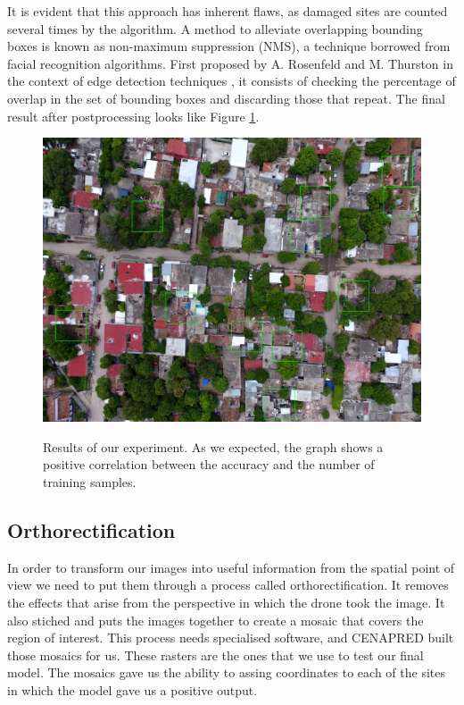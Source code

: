 It is evident that this approach has inherent flaws, as damaged sites are counted several times by the algorithm. A method to alleviate overlapping bounding boxes is known as non-maximum suppression (NMS), a technique borrowed from facial recognition algorithms. First proposed by A. Rosenfeld and M. Thurston in the context of edge detection techniques \cite{1671883}, it consists of checking the percentage of overlap in the set of bounding boxes and discarding those that repeat. The final result after postprocessing looks like Figure \ref{fig:no-overlap}.\\


\begin{figure}[!h]
  \centering
  \includegraphics[width=\textwidth]{images/no-overlap.jpg}
  \label{fig:no-overlap}
  \caption{Results of our experiment. As we expected, the graph shows a positive correlation between the accuracy and the number of training samples.}
\end{figure}


\subsection{Orthorectification}

In order to transform our images into useful information from the spatial point of view we need to put them through a process called orthorectification. It removes the effects that arise from the perspective in which the drone took the image. It also stiched and puts the images together to create a mosaic that covers the region of interest. This process needs specialised software, and CENAPRED built those mosaics for us. These rasters are the ones that we use to test our final model. The mosaics gave us the ability to assing coordinates to each of the sites in which the model gave us a positive output. 




